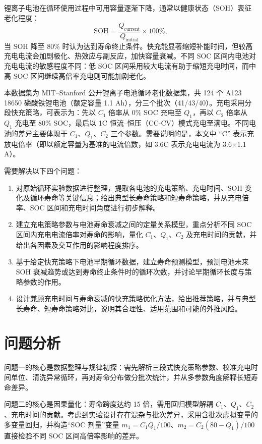 \documentclass[withoutpreface]{cumcmthesis}
\begin{document}
锂离子电池在循环使用过程中可用容量逐渐下降，通常以健康状态（SOH）表征老化程度：
\[
\mathrm{SOH}=\frac{Q_{\mathrm{current}}}{Q_{\mathrm{initial}}}\times 100\%,
\]
当 SOH 降至 80\% 时认为达到寿命终止条件。快充能显著缩短补能时间，但较高充电电流会加剧极化、热效应与副反应，加快容量衰减。不同 SOC 区间内电池对充电电流的敏感程度不同：低 SOC 区间采用较大电流有助于缩短充电时间，而中高 SOC 区间继续高倍率充电则可能加剧老化。

本数据集为 MIT--Stanford 公开锂离子电池循环老化数据集，共 124 个 A123 18650 磷酸铁锂电池（额定容量 1.1 Ah），分三个批次（41/43/40）。充电采用分段快充策略，可表示为：先以 $C_1$ 倍率从 0\% SOC 充电至 $Q_1$，再以 $C_2$ 倍率从 $Q_1$ 充电至 80\% SOC，最后以 1C 恒流--恒压（CC-CV）模式充电至满电。不同电池的差异主要体现于 $C_1$、$Q_1$、$C_2$ 三个参数。需要说明的是，本文中 “C” 表示充放电倍率（即以额定容量为基准的电流倍数，如 3.6C 表示充电电流为 3.6$\times$1.1 A）。

需要解决以下四个问题：
\begin{enumerate}
\item 对原始循环实验数据进行整理，提取各电池的充电策略、充电时间、SOH 变化及循环寿命等关键信息；给出典型长寿命策略和短寿命策略，并从充电倍率、SOC 区间和充电时间角度进行初步解释。
\item 建立充电策略参数与电池寿命衰减之间的定量关系模型，重点分析不同 SOC 区间内充电电流倍率对寿命的影响，量化 $C_1$、$Q_1$、$C_2$ 及充电时间的贡献，并给出各因素及交互作用的影响程度排序。
\item 基于给定快充策略下电池早期循环数据，建立寿命预测模型，预测电池未来 SOH 衰减趋势或达到寿命终止条件时的循环次数，并讨论早期循环长度与策略参数的作用。
\item 设计兼顾充电时间与寿命衰减的快充策略优化方法，给出推荐策略，并与典型长寿命、短寿命策略对比，说明其合理性、适用范围和可能的外推风险。
\end{enumerate}

\section{问题分析}

问题一的核心是数据整理与规律初探：需先解析三段式快充策略参数、校准充电时间单位、清洗异常循环，再对寿命分布做分批次统计，并从多参数角度解释长短寿命差异。

问题二的核心是因果量化：寿命跨度达约 15 倍，需用回归模型解耦 $C_1$、$Q_1$、$C_2$、充电时间的贡献。考虑到实验设计存在混杂与批次差异，采用含批次虚拟变量的多变量回归，并构造“SOC 剂量”变量 $m_1=C_1Q_1/100$、$m_2=C_2(80-Q_1)/100$ 直接检验不同 SOC 区间高倍率影响的差异。
\end{document}
